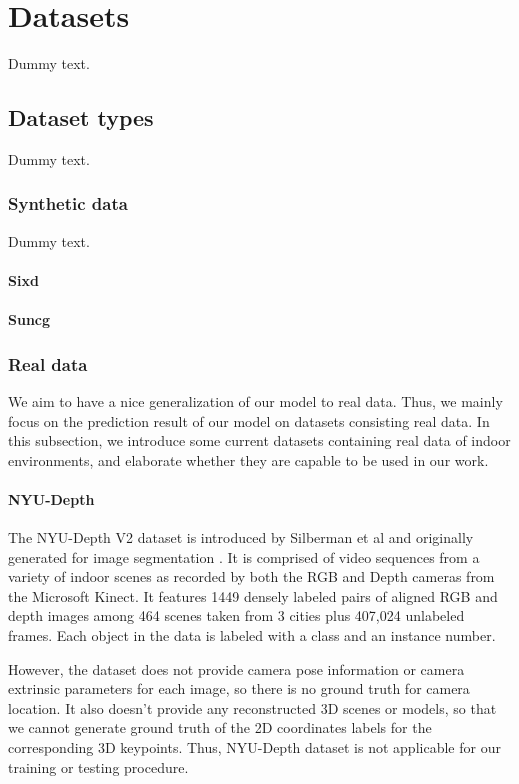 \chapter{Datasets}

Dummy text.

\section{Dataset types}

Dummy text.

\subsection{Synthetic data}

Dummy text.
\subsubsection{Sixd}


\subsubsection{Suncg}


\subsection{Real data}
We aim to have a nice generalization of our model to real data. Thus, we mainly focus on the prediction result of our model on datasets consisting real data. In this subsection, we introduce some current datasets containing real data of indoor environments, and elaborate whether they are capable to be used in our work.

\subsubsection{NYU-Depth}
The NYU-Depth V2 dataset is introduced by Silberman et al and originally generated for image segmentation \cite{Silberman:ECCV12}. It is comprised of video sequences from a variety of indoor scenes as recorded by both the RGB and Depth cameras from the Microsoft Kinect. It features 1449 densely labeled pairs of aligned RGB and depth images among 464 scenes taken from 3 cities plus 407,024 unlabeled frames. Each object in the data is labeled with a class and an instance number.

However, the dataset does not provide camera pose information or camera extrinsic parameters for each image, so there is no ground truth for camera location. It also doesn't provide any reconstructed 3D scenes or models, so that we cannot generate ground truth of the 2D coordinates labels for the corresponding 3D keypoints. Thus, NYU-Depth dataset is not applicable for our training or testing procedure.


